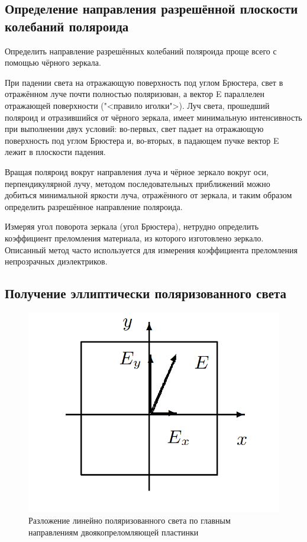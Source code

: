 \documentclass[12pt]{kiarticle}
\begin{document}
	\subsection{Определение направления разрешённой плоскости колебаний поляроида}
	
	Определить направление разрешённых колебаний поляроида проще всего с помощью чёрного зеркала.
	
При падении света на отражающую поверхность под углом Брюстера, свет в отражённом луче почти полностью поляризован, а вектор E
параллелен отражающей поверхности ("<правило иголки">). Луч света,
прошедший поляроид и отразившийся от чёрного зеркала, имеет минимальную интенсивность при выполнении двух условий: во-первых, свет
падает на отражающую поверхность под углом Брюстера и, во-вторых,
в падающем пучке вектор E лежит в плоскости падения.

Вращая поляроид вокруг направления луча и чёрное зеркало вокруг
оси, перпендикулярной лучу, методом последовательных приближений
можно добиться минимальной яркости луча, отражённого от зеркала,
и таким образом определить разрешённое направление поляроида.

Измеряя угол поворота зеркала (угол Брюстера), нетрудно определить коэффициент преломления материала, из которого изготовлено
зеркало. Описанный метод часто используется для измерения коэффициента преломления непрозрачных диэлектриков.

\subsection{Получение эллиптически поляризованного света}
\begin{figure} 
	\includegraphics[width=\linewidth]{1}
	\caption{Разложение линейно поляризованного света по главным направлениям двоякопреломляющей пластинки}
	\label{ris 1}
\end{figure}
\end{document}

